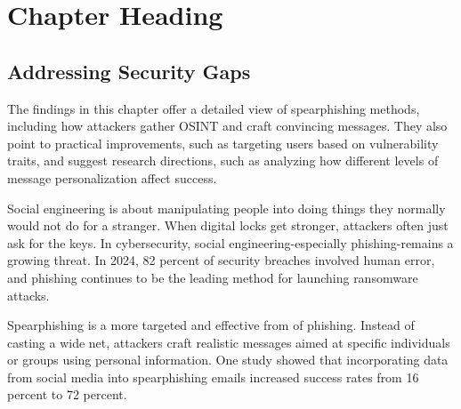 %
%
%
\chapter{Chapter Heading}
\label{intro} %


\section{Addressing Security Gaps}
The findings in this chapter offer a detailed view of spearphishing methods, including how attackers gather OSINT and craft convincing messages. They also point to practical improvements, such as targeting users based on vulnerability traits, and suggest research directions, such as analyzing how different levels of message personalization affect success.

Social engineering is about manipulating people into doing things they normally would not do for a stranger. When digital locks get stronger, attackers often just ask for the keys. In cybersecurity, social engineering-especially phishing-remains a growing threat. In 2024, 82 percent of security breaches involved human error, and phishing continues to be the leading method for launching ransomware attacks.

Spearphishing is a more targeted and effective from of phishing. Instead of casting a wide net, attackers craft realistic messages aimed at specific individuals or groups using personal information. One study showed that incorporating data from social media into spearphishing emails increased success rates from 16 percent to 72 percent.


